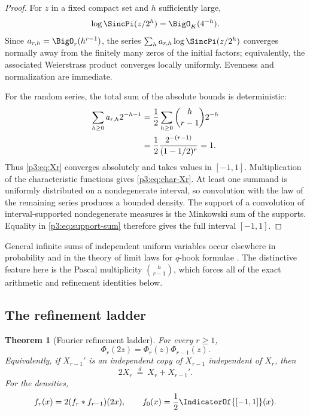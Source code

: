\documentclass[11pt,oneside]{article}
\newtheorem{theorem}{Theorem}[section]
\theoremstyle{definition}
\theoremstyle{remark}
\begin{document}
\begin{proof}
For $z$ in a fixed compact set and $h$ sufficiently large,
\[
 \log\SincPi(z/2^h)=\BigO_K(4^{-h}).
\]
Since $a_{r,h}=\BigO_r(h^{r-1})$, the series
$\sum_h a_{r,h}\log\SincPi(z/2^h)$ converges normally away from the finitely many zeros of the initial factors; equivalently, the associated Weierstrass product converges locally uniformly.  Evenness and normalization are immediate.

For the random series, the total sum of the absolute bounds is deterministic:
\begin{align}
 \sum_{h\ge0}a_{r,h}2^{-h-1}
 &=\frac12\sum_{h\ge0}\binom h{r-1}2^{-h}\notag\\
 &=\frac12\frac{2^{-(r-1)}}{(1-1/2)^r}=1.\label{p3:eq:support-sum}
\end{align}
Thus \eqref{p3:eq:Xr} converges absolutely and takes values in $[-1,1]$.  Multiplication of the characteristic functions gives \eqref{p3:eq:char-Xr}.  At least one summand is uniformly distributed on a nondegenerate interval, so convolution with the law of the remaining series produces a bounded density.  The support of a convolution of interval-supported nondegenerate measures is the Minkowski sum of the supports.  Equality in \eqref{p3:eq:support-sum} therefore gives the full interval $[-1,1]$.
\end{proof}

\begin{remark}
General infinite sums of independent uniform variables occur elsewhere in probability and in the theory of limit laws for $q$-hook formulae \cite{p3:jessen-wintner,p3:billey-swanson}.  The distinctive feature here is the Pascal multiplicity $\binom h{r-1}$, which forces all of the exact arithmetic and refinement identities below.
\end{remark}

\subsection{The refinement ladder}

\begin{theorem}[Fourier refinement ladder]\label{p3:thm:refinement}
For every $r\ge1$,
\begin{equation}\label{p3:eq:refinement-fourier}
  \Phi_r(2z)=\Phi_r(z)\Phi_{r-1}(z).
\end{equation}
Equivalently, if $X_{r-1}'$ is an independent copy of $X_{r-1}$ independent of $X_r$, then
\begin{equation}\label{p3:eq:refinement-prob}
  2X_r\ \stackrel{d}{=}\ X_r+X_{r-1}'.
\end{equation}
For the densities,
\begin{equation}\label{p3:eq:refinement-density}
  f_r(x)=2(f_r*f_{r-1})(2x),
  \qquad
  f_0(x)=\frac12\IndicatorOf{[-1,1]}(x).
\end{equation}
\end{theorem}
\end{document}
